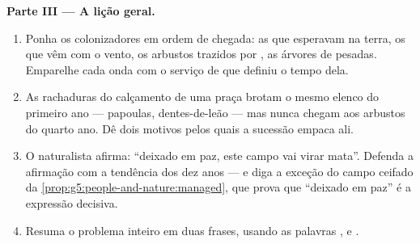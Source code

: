\begin{problem}
\medskip\noindent\textbf{Parte III --- A lição geral.}
\begin{enumerate}[resume]
  \item Ponha os colonizadores em ordem de chegada: as  que
        esperavam na terra, os que vêm com o vento, os arbustos
        trazidos por , as árvores de  pesadas.
        Emparelhe cada onda com o serviço de  que definiu o
        tempo dela.
  \item As rachaduras do calçamento de uma praça brotam o mesmo
        elenco do primeiro ano --- papoulas, dentes-de-leão --- mas
        nunca chegam aos arbustos do quarto ano. Dê dois motivos
        pelos quais a sucessão empaca ali.
  \item O naturalista afirma: ``deixado em paz, este campo vai virar
        mata''. Defenda a afirmação com a tendência dos dez anos ---
        e diga a exceção do campo ceifado da
        \cref{prop:g5:people-and-nature:managed}, que prova que
        ``deixado em paz'' é a expressão decisiva.
  \item Resuma o problema inteiro em duas frases, usando as palavras
        \emph{}, \emph{} e \emph{}.
\end{enumerate}
\end{problem}
